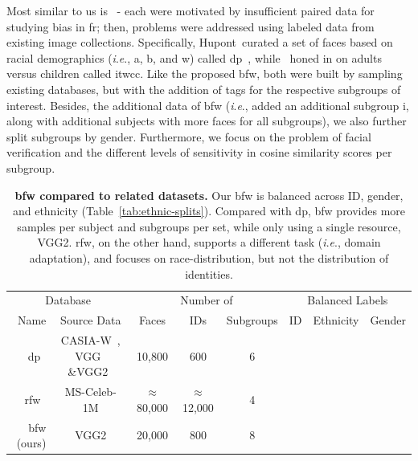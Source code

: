 \documentclass[10pt,twocolumn,letterpaper]{article}
\newcommand{\ie}{\textit{i}.\textit{e}., }
\newcommand{\xmark}{\ding{56}}%
\newcommand{\checkc}{\ding{51}}%
\begin{document}
    
Most similar to us is~\cite{das2018, demogPairs, lopez2019dataset, srinivas2019face} - each were motivated by insufficient paired data for studying bias in \gls{fr}; then, problems were addressed using labeled data from existing image collections. Specifically, Hupont~\etal curated a set of faces based on racial demographics (\ie \gls{a}, \gls{b}, and \gls{w}) called \gls{dp}~\cite{demogPairs}, while~\cite{srinivas2019face} honed in on adults versus children called \gls{itwcc}. Like the proposed \gls{bfw}, both were built by sampling existing databases, but with the addition of tags for the respective subgroups of interest. Besides, the additional data of \gls{bfw} (\ie added an additional subgroup \gls{i}, along with additional subjects with more faces for all subgroups), we also further split subgroups by gender. Furthermore, we focus on the problem of facial verification and the different levels of sensitivity in cosine similarity scores per subgroup.

    \begin{table}[t!]
        
        \centering
        \caption{\small{\textbf{\gls{bfw} compared to related datasets.} Our \gls{bfw} is balanced across ID, gender, and ethnicity (Table~\ref{tab:ethnic-splits}). Compared with \gls{dp}, \gls{bfw} provides more samples per subject and subgroups per set, while only using a single resource, VGG2. \gls{rfw}, on the other hand, supports a different task (\ie domain adaptation), and focuses on race-distribution, but not the distribution of identities.}}
        \scriptsize
        \begin{tabular}{rccccccc}%
        
            \multicolumn{2}{c}{Database} & \multicolumn{3}{c}{Number of}& \multicolumn{3}{c}{Balanced Labels}\\
            \cmidrule(lr){1-2}	\cmidrule(lr){3-5} \cmidrule(lr){6-8}
            Name & Source Data & Faces &  IDs & Subgroups & ID & Ethnicity & Gender\\\midrule
            \gls{dp}~\cite{demogPairs}     & CASIA-W~\cite{yi2014learning}, VGG~\cite{schroff2015facenet} \&VGG2~\cite{Cao18} & 10,800& 600 & 6 &\checkc& \checkc &\checkc \\
            \gls{rfw}~\cite{wang2018racial}     &  MS-Celeb-1M &$\approx$80,000&$\approx$12,000& 4 & \xmark & \checkc &\xmark \\
            \gls{bfw} (ours) & VGG2 & 20,000 & 800 &8 & \checkc & \checkc &\checkc \\\bottomrule
        \end{tabular}
        \label{tab:compared}
    \end{table}
    
\end{document}
